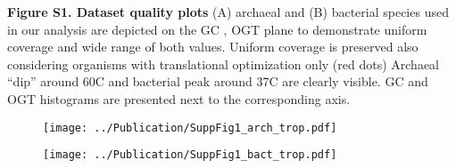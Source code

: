 \documentclass{report}
\begin{document}
{\bf Figure S1. Dataset quality plots} (A) archaeal and (B) bacterial species used in our analysis are depicted on the GC , OGT plane to demonstrate uniform coverage and wide range of both values. Uniform coverage is preserved also considering organisms with translational optimization only (red dots)  Archaeal ``dip'' around 60C and bacterial peak around 37C are clearly visible. GC and OGT histograms are presented next to the corresponding axis. 

\begin{figure}[h!]
	\centering
	\texttt{[image: ../Publication/SuppFig1\_arch\_trop.pdf]}
\end{figure}


\begin{figure}[h!]
	\centering
	\texttt{[image: ../Publication/SuppFig1\_bact\_trop.pdf]}
\end{figure}
\end{document}
